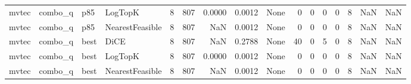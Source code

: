 \begin{tabular}{llllrrrrlrrrrrrr}
  mvtec &              combo\_q &    p85 &         LogTopK &            8 &                  807 &                   0.0000 &      0.0012 &                                               None &      0 &            0 &        0 &              0 &          8 &                NaN &            NaN \\
  mvtec &              combo\_q &    p85 & NearestFeasible &            8 &                  807 &                      NaN &      0.0012 &                                               None &      0 &            0 &        0 &              0 &          8 &                NaN &            NaN \\
  mvtec &              combo\_q &   best &            DiCE &            8 &                  807 &                      NaN &      0.2788 &                                               None &     40 &            0 &        5 &              0 &          8 &                NaN &            NaN \\
  mvtec &              combo\_q &   best &         LogTopK &            8 &                  807 &                   0.0000 &      0.0012 &                                               None &      0 &            0 &        0 &              0 &          8 &                NaN &            NaN \\
  mvtec &              combo\_q &   best & NearestFeasible &            8 &                  807 &                      NaN &      0.0012 &                                               None &      0 &            0 &        0 &              0 &          8 &                NaN &            NaN \\
\bottomrule
\end{tabular}
